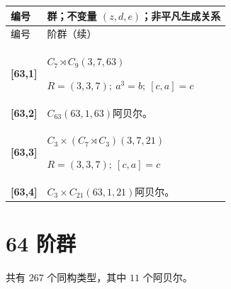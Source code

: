 \documentclass[UTF8,fontset=fandol,11pt,a4paper]{ctexart}
\begin{document}
\begin{longtable}{@{}p{17mm}>{\raggedright\arraybackslash}p{141mm}@{}}

\toprule 编号 & 群；不变量 $(z,d,e)$；非平凡生成关系\\\midrule\endfirsthead

\toprule 编号 & 63 阶群（续）\\\midrule\endhead\bottomrule\endfoot

\textbf{[63,1]} & $C_{7}\rtimes C_{9}$\quad $(3,7,63)$\par\(R=(3,3,7);\allowbreak\ a^{3}=b;\allowbreak\ [c,a]=c\)\\[3pt]

\textbf{[63,2]} & $C_{63}$\quad $(63,1,63)$\quad 阿贝尔。\\[3pt]

\textbf{[63,3]} & $C_{3}\times (C_{7}\rtimes C_{3})$\quad $(3,7,21)$\par\(R=(3,3,7);\allowbreak\ [c,a]=c\)\\[3pt]

\textbf{[63,4]} & $C_{3}\times C_{21}$\quad $(63,1,21)$\quad 阿贝尔。\\[3pt]

\end{longtable}\endgroup

\section*{64 阶群}\label{order:64}

共有 $267$ 个同构类型，其中 $11$ 个阿贝尔。

\begingroup\small\setlength{\tabcolsep}{3pt}\renewcommand{\arraystretch}{1.12}
\end{document}
